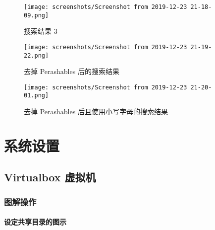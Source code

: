\documentclass[
    11pt,
    cite=authoryear,
    device=normal,
    lang=cn,
    mode=simple,
    result=answer,
    toc=onecol,
]{elegantbook_sierxue}
\begin{document}
\begin{figure}[!htbp]
  \centering
  \texttt{[image: screenshots/Screenshot from
  2019-12-23 21-18-09.png]}
  \caption{搜索结果 3}
  \label{fig:ludwig-result-3}
\end{figure}

\begin{figure}[!htbp]
  \centering
  \texttt{[image: screenshots/Screenshot from
  2019-12-23 21-19-22.png]}
  \caption{去掉 Perashables 后的搜索结果}
  \label{fig:ludwig-result-4}
\end{figure}

\begin{figure}[!htbp]
  \centering
  \texttt{[image: screenshots/Screenshot from
  2019-12-23 21-20-01.png]}
  \caption{去掉 Perashables 后且使用小写字母的搜索结果}
  \label{fig:ludwig-result-5}
\end{figure}


%

\appendix

\chapter{系统设置}%
\label{cha:settings-system-a}

\section{Virtualbox 虚拟机}

\subsection{图解操作}%
\label{sub:vbox-graphic-illustration}

\subsubsection{设定共享目录的图示}%
\label{ssub:vbox-set-share-folder-a}
\end{document}
